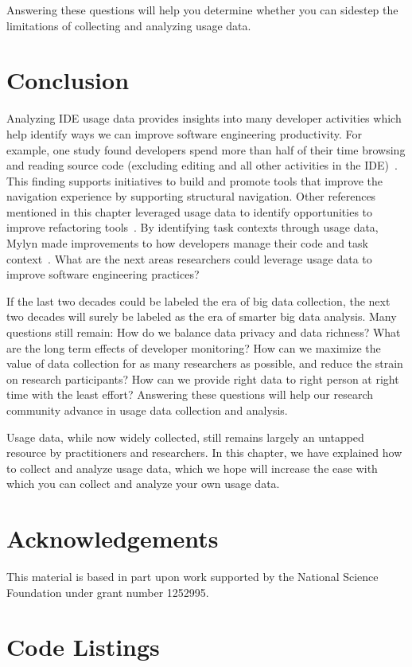 \documentclass{book}
\begin{document}
\noindent
Answering these questions will help you determine whether you can sidestep
the limitations of collecting and analyzing usage data.

\section{Conclusion}

Analyzing IDE usage data provides insights into many developer activities which help identify ways we can improve software engineering productivity.  For example, one study found developers spend more than half of their time browsing and reading source code (excluding editing and all other activities in the IDE)~\cite{SnipesExperiencesGamifyingSoftwareDevelopment}.  This finding supports initiatives to build and promote tools that improve the navigation experience by supporting structural navigation.  Other references mentioned in this chapter leveraged usage data to identify opportunities to improve refactoring tools~\cite{VakilianJohnson2014Alternate,MurphyHill2012Improving}.  By identifying task contexts through usage data, Mylyn made improvements to how developers manage their code and task context~\cite{Kersten-Mylyn}.  What are the next areas researchers could leverage usage data to improve software engineering practices?

If the last two decades could be labeled the era
of big data collection,
the next two decades will surely be labeled as the
era of smarter big data analysis.
Many questions still remain:
How do we balance data privacy and data richness?
What are the long term effects of developer monitoring?
How can we maximize the value of data collection
for as many researchers as possible, and reduce the
strain on research participants? How can we provide right data to right person at right time with the least effort?
Answering these questions will help our research
community advance in usage data collection and analysis.

Usage data, while now widely collected, still remains largely
an untapped resource by practitioners and researchers.
In this chapter, we have explained how to collect and
analyze usage data, which we hope will increase the ease
with which you can collect and analyze your own usage data.


\section{Acknowledgements}

This material is based in part upon work supported by the National 
Science Foundation under grant number 1252995.

\section{Code Listings}



 
\end{document}
